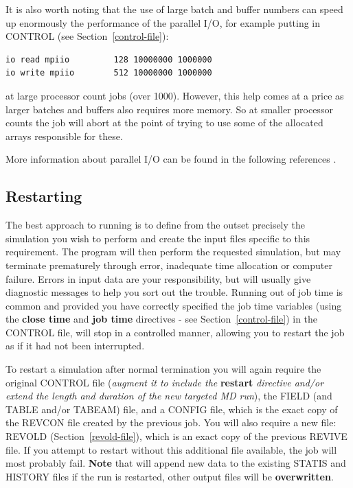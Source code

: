 It is also worth noting that the use of large batch and buffer
numbers can speed up enormously the performance of the parallel I/O,
for example putting in CONTROL (see Section~\ref{control-file}):
\begin{lstlisting}
io read mpiio         128 10000000 1000000
io write mpiio        512 10000000 1000000
\end{lstlisting}
at large processor count jobs (over 1000).  However, this help comes
at a price as larger batches and buffers also requires more memory.
So at smaller processor counts the job will abort at the point of
trying to use some of the allocated arrays responsible for these.

More information about \D parallel I/O can be found in the following
references \cite{todorov-09a,todorov-08a,bush-10a}.

\subsection{Restarting}

The best approach to running \D is to define from the outset
precisely the simulation you wish to perform and create the input
files specific to this requirement.  The program will then perform
the requested simulation, but may terminate prematurely through
error, inadequate time allocation or computer failure.  Errors in
input data are your responsibility, but \D will usually give
diagnostic messages to help you sort out the trouble.  Running out
of job time is common and provided you have correctly specified
the job time variables (using the {\bf close time} and {\bf job
time} directives - see Section~\ref{control-file}) in the CONTROL
file, \D will stop in a controlled manner, allowing you to restart
the job as if it had not been interrupted.

To restart a simulation after normal termination you will again
require the original CONTROL file ({\em augment it to include the}
{\bf restart} {\em directive and/or extend the length and duration
of the new targeted MD run}), the FIELD (and TABLE and/or TABEAM)
file, and a CONFIG file, which is the exact copy of the REVCON file
created by the previous job.  You will also require a new file:
REVOLD (Section~\ref{revold-file}), which is an exact copy of the
previous REVIVE file.  If you attempt to restart \D without this
additional file available, the job will most probably fail.
{\bf Note} that \D will append new data to the existing STATIS and
HISTORY files if the run is restarted, other output files will be
{\bf overwritten}.

